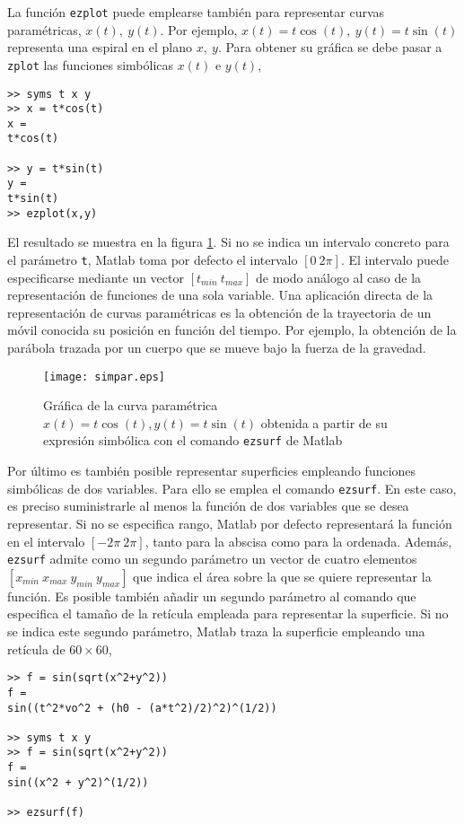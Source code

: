 La función \texttt{ezplot} puede emplearse también para representar curvas paramétricas, $x(t),\ y(t)$. Por ejemplo, $x(t) = t\cos(t),\  y(t)= t\sin(t)$ representa una espiral en el plano $x,\ y$. Para obtener su gráfica se debe pasar a \texttt{zplot} las funciones simbólicas $x(t)$ e $y(t)$,
\begin{verbatim}
>> syms t x y
>> x = t*cos(t)
x = 
t*cos(t)
 
>> y = t*sin(t) 
y = 
t*sin(t) 
>> ezplot(x,y)
\end{verbatim}

El resultado se muestra en la figura \ref{fig:simpar}. Si no se  indica un intervalo concreto para el parámetro \texttt{t}, Matlab toma por defecto el intervalo $[0 \ 2\pi]$. El intervalo puede especificarse mediante un vector $[t_{min} \ t_{max}]$ de modo análogo al caso de la representación de funciones de una sola variable. Una aplicación directa de la representación de curvas paramétricas es la obtención de la trayectoria de un móvil conocida su posición en función del tiempo. Por ejemplo, la obtención de la parábola trazada por un cuerpo que se mueve bajo la fuerza de la gravedad. 

\begin{figure}[h]
\centering
\texttt{[image: simpar.eps]}
\caption{Gráfica de la curva paramétrica $x(t) = t\cos(t), y(t)= t\sin(t)$ obtenida a partir de su expresión simbólica con el comando \texttt{ezsurf} de Matlab }
\label{fig:simpar}
\end{figure}

Por último es también posible representar superficies empleando funciones simbólicas de dos variables. Para ello se emplea el comando \texttt{ezsurf}. En este caso, es preciso suministrarle al menos la función de dos variables que se desea representar. Si no se especifica rango, Matlab por defecto representará la función en el intervalo $[-2\pi \ 2\pi]$, tanto para la abscisa como para la ordenada. Además, \texttt{ezsurf} admite como un segundo parámetro un vector de cuatro elementos $[x_{min} \ x_{max} \ y_{min} \ y_{max}]$ que indica el área sobre la que se quiere representar la función. Es posible también añadir un segundo parámetro al comando que especifica el tamaño de la retícula empleada para representar la superficie. Si no se indica este segundo parámetro, Matlab traza la superficie empleando una retícula de $60 \times 60$,


\begin{verbatim}
>> f = sin(sqrt(x^2+y^2))
f =
sin((t^2*vo^2 + (h0 - (a*t^2)/2)^2)^(1/2))
 
>> syms t x y
>> f = sin(sqrt(x^2+y^2))
f =
sin((x^2 + y^2)^(1/2))
 
>> ezsurf(f)
\end{verbatim}

